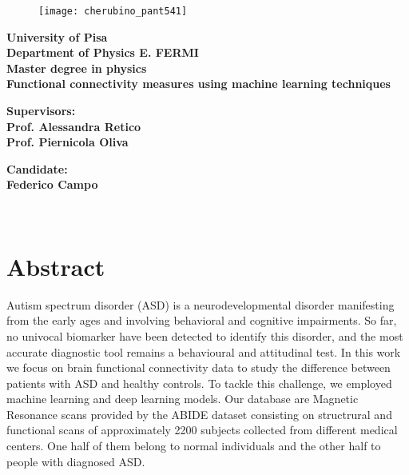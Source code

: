 \documentclass[11pt]{report}
\author{Federico}
\begin{document}
\begin{titlepage}
\begin{figure}[t]
\centering
\texttt{[image: cherubino\_pant541]}
\end{figure}

\begin{center}
	\textbf{University of Pisa \\ Department of Physics E. FERMI\\ Master degree in physics\\}
	\vspace{20mm}
    {\LARGE{\bf Functional connectivity measures using machine learning techniques}}
\end{center}

\vspace{36mm}
\begin{minipage}[t]{0.47\textwidth}
	{\large{\bf Supervisors:\\ Prof. Alessandra Retico\\ Prof. Piernicola Oliva}}
\end{minipage}\hfill\begin{minipage}[t]{0.47\textwidth}\raggedleft
	{\large{\bf Candidate: \\ Federico Campo}}
\end{minipage}

\vspace{60mm}
\hrulefill
\\

\end{titlepage}


\tableofcontents

\chapter*{Abstract}

Autism spectrum disorder (ASD) is a neurodevelopmental disorder manifesting from the early ages and involving behavioral and cognitive impairments. So far, no univocal biomarker have been detected to identify this disorder, and the most accurate diagnostic tool remains a behavioural and attitudinal test.
In this work we focus on brain functional connectivity data to study the difference between patients with ASD and healthy controls. To tackle this challenge, we  employed machine learning and deep learning models.
Our database are Magnetic Resonance scans provided by the ABIDE dataset consisting on structrural and functional scans of approximately 2200 subjects collected from different medical centers.
One half of them belong to normal individuals and the other half to people with diagnosed ASD.
\end{document}
